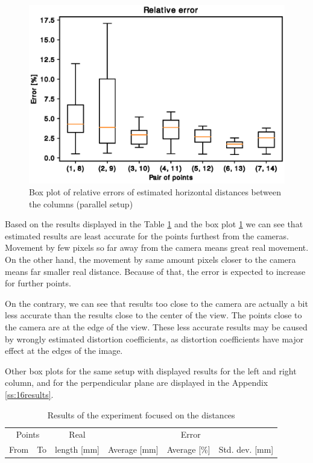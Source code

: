 \begin{figure}
\includegraphics[width=\linewidth]{experiments/horizontal1.eps}
\caption{Box plot of relative errors of estimated horizontal distances between the columns (parallel setup)}
\label{fig:horizontal-boxplot}
\end{figure}

Based on the results displayed in the Table \ref{table:distances} and the box
plot \ref{fig:horizontal-boxplot} we can see that estimated results are least accurate
for the points furthest from the cameras. Movement by few pixels so far away
from the camera means great real movement.  On the other hand, the
movement by same amount pixels closer to the camera means far smaller
real distance. Because of that, the error is expected to increase for
further points.

On the contrary, we can see that results too close to the camera are actually a
bit less accurate than the results close to the center of the view. The points
close to the camera are at the edge of the view. These less accurate results
may be caused by wrongly estimated distortion coefficients, as distortion
coefficients have major effect at the edges of the image.

Other box plots for the same setup with displayed results for the left and
right column, and for the perpendicular plane are displayed in the Appendix
\ref{ss:16results}.

\begin{table}
\centering
\begin{tabular}{|r|r|r|r|r|r|}
\hline
\multicolumn{2}{|c|}{Points} & \multicolumn{1}{c|}{Real} & \multicolumn{3}{c|}{Error} \\ 
\cline{1-2} \cline{4-6}
From & To & length [mm] & Average [mm] & Average [\%] & Std. dev. [mm]\\
\hline
\hline

\hline
\end{tabular}
\caption{Results of the experiment focused on the distances}
\label{table:distances}
\end{table}

